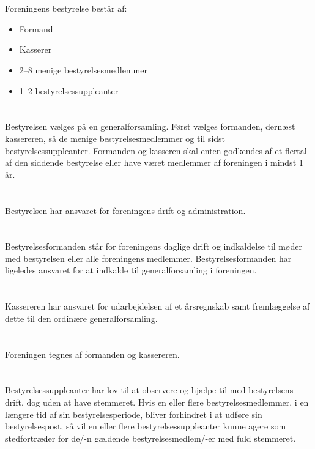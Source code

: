\documentclass[danish,a4paper,twocolumn,oneside,article]{memoir}
\begin{document}
\section{} Foreningens bestyrelse består af:

\begin{itemize}
\item Formand
\item Kasserer
\item 2--8 menige bestyrelsesmedlemmer
\item 1--2 bestyrelsessuppleanter
\end{itemize}

\section{}\label{s:howvote} Bestyrelsen vælges på en generalforsamling. Først vælges formanden, dernæst kassereren, så de menige
bestyrelsesmedlemmer og til sidst bestyrelsessuppleanter. Formanden og kasseren skal enten godkendes af et flertal
af den siddende bestyrelse eller have været medlemmer af foreningen i mindst 1 år.

\section{} Bestyrelsen har ansvaret for foreningens drift og administration.

\section{} Bestyrelsesformanden står for foreningens daglige drift og indkaldelse til møder med bestyrelsen
eller alle foreningens medlemmer. Bestyrelsesformanden har ligeledes ansvaret for at indkalde til
generalforsamling i foreningen.

\section{} Kassereren har ansvaret for udarbejdelsen af et årsregnskab samt fremlæggelse af dette til den
ordinære generalforsamling.

\section{} Foreningen tegnes af formanden og kassereren.

\section{} Bestyrelsessuppleanter har lov til at observere og hjælpe til med bestyrelsens drift, dog uden at have stemmeret.
Hvis en eller flere bestyrelsesmedlemmer, i en længere tid af sin bestyrelsesperiode, bliver forhindret i at udføre sin bestyrelsespost,
så vil en eller flere bestyrelsessuppleanter kunne agere som stedfortræder for de/-n gældende bestyrelsesmedlem/-er med fuld stemmeret.
\end{document}
